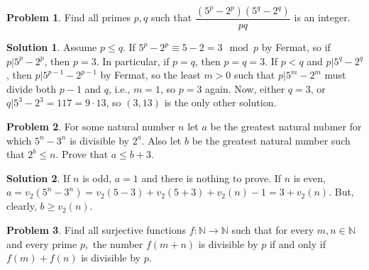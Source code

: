 \documentclass{article}
\theoremstyle{definition}
\newtheorem{problem}{Problem}
\newtheorem*{solution}{Solution}
\begin{document}
\begin{problem}
Find all primes $p,q$ such that $\dfrac{(5^p-2^p)(5^q-2^q)}{pq}$ is an integer.
\end{problem}

\begin{solution}
Assume $p\le q$. If $5^p-2^p\equiv 5-2=3\mod p$ by Fermat, so if $p|5^p-2^p$, then $p=3$. In particular, if $p=q$, then $p=q=3$. If $p< q$ and $p|5^q-2^q$, then $p|5^{p-1}-2^{p-1}$ by Fermat, so the least $m> 0$ such that $p|5^m-2^m$ must divide both $p-1$ and $q$, i.e., $m=1$, so $p=3$ again. Now, either $q=3$, or $q|5^3-2^3=117=9\cdot 13$, so $(3,13)$ is the only other solution.
\end{solution}

\begin{problem}
For some natural number $n$ let $a$ be the greatest natural nubmer for which $5^{n}-3^{n}$ is divisible by $2^{a}$. Also let $b$ be the greatest natural number such that $2^{b} \leq n$. Prove that $a \leq b+3$.
\end{problem}

\begin{solution}
If $n$ is odd, $a=1$ and there is nothing to prove. If $n$ is even, $a=v_2(5^n-3^n)=v_2(5-3)+v_2(5+3)+v_2(n)-1=3+v_2(n)$. But, clearly, $b\ge v_2(n)$.
\end{solution}

\begin{problem}
Find all surjective functions $ f: \mathbb{N} \to \mathbb{N}$ such that for every $ m,n \in \mathbb{N}$ and every prime $ p,$ the number $ f(m + n)$ is divisible by $ p$ if and only if $ f(m)+ f(n)$ is divisible by $ p.$
\end{problem}
\end{document}
